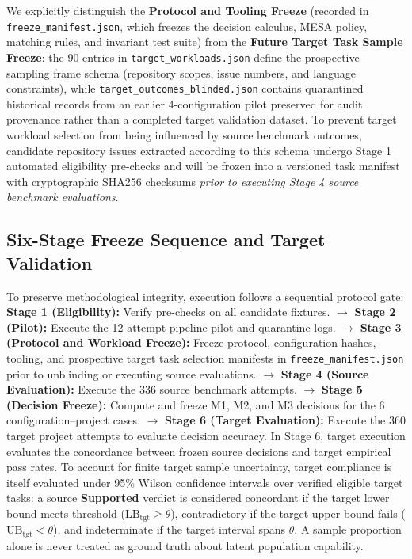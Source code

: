 \documentclass[runningheads]{llncs}
\begin{document}
We explicitly distinguish the \textbf{Protocol and Tooling Freeze} (recorded in \texttt{freeze\_manifest.json}, which freezes the decision calculus, MESA policy, matching rules, and invariant test suite) from the \textbf{Future Target Task Sample Freeze}: the 90 entries in \texttt{target\_workloads.json} define the prospective sampling frame schema (repository scopes, issue numbers, and language constraints), while \texttt{target\_outcomes\_blinded.json} contains quarantined historical records from an earlier 4-configuration pilot preserved for audit provenance rather than a completed target validation dataset. To prevent target workload selection from being influenced by source benchmark outcomes, candidate repository issues extracted according to this schema undergo Stage 1 automated eligibility pre-checks and will be frozen into a versioned task manifest with cryptographic SHA256 checksums \emph{prior to executing Stage 4 source benchmark evaluations}.

\subsection{Six-Stage Freeze Sequence and Target Validation}
To preserve methodological integrity, execution follows a sequential protocol gate:
\textbf{Stage 1 (Eligibility):} Verify pre-checks on all candidate fixtures. $\to$
\textbf{Stage 2 (Pilot):} Execute the 12-attempt pipeline pilot and quarantine logs. $\to$
\textbf{Stage 3 (Protocol and Workload Freeze):} Freeze protocol, configuration hashes, tooling, and prospective target task selection manifests in \texttt{freeze\_manifest.json} prior to unblinding or executing source evaluations. $\to$
\textbf{Stage 4 (Source Evaluation):} Execute the 336 source benchmark attempts. $\to$
\textbf{Stage 5 (Decision Freeze):} Compute and freeze M1, M2, and M3 decisions for the 6 configuration--project cases. $\to$
\textbf{Stage 6 (Target Evaluation):} Execute the 360 target project attempts to evaluate decision accuracy. In Stage 6, target execution evaluates the concordance between frozen source decisions and target empirical pass rates. To account for finite target sample uncertainty, target compliance is itself evaluated under 95\% Wilson confidence intervals over verified eligible target tasks: a source \textbf{Supported} verdict is considered concordant if the target lower bound meets threshold ($\text{LB}_{\text{tgt}} \ge \theta$), contradictory if the target upper bound fails ($\text{UB}_{\text{tgt}} < \theta$), and indeterminate if the target interval spans $\theta$. A sample proportion alone is never treated as ground truth about latent population capability.
\end{document}
